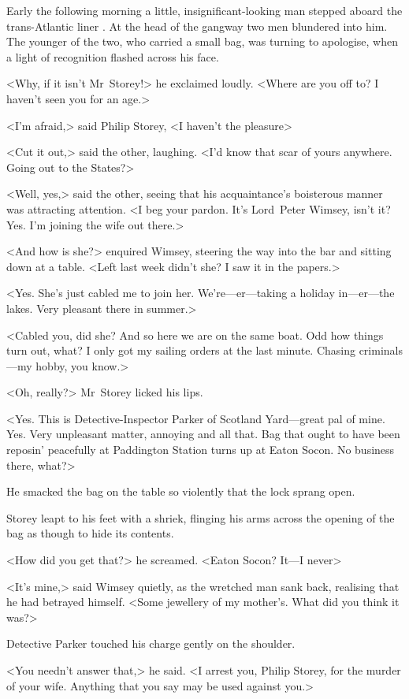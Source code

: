 \divider
Early the following morning a little, insignificant-looking man stepped aboard the trans-Atlantic liner . At the head of the gangway two men blundered into him. The younger of the two, who carried a small bag, was turning to apologise, when a light of recognition flashed across his face.

<Why, if it isn't Mr~Storey!> he exclaimed loudly. <Where are you off to? I haven't seen you for an age.>

<I'm afraid,> said Philip Storey, <I haven't the pleasure\longdash>

<Cut it out,> said the other, laughing. <I'd know that scar of yours anywhere. Going out to the States?>

<Well, yes,> said the other, seeing that his acquaintance's boisterous manner was attracting attention. <I beg your pardon. It's Lord~Peter Wimsey, isn't it? Yes. I'm joining the wife out there.>

<And how is she?> enquired Wimsey, steering the way into the bar and sitting down at a table. <Left last week didn't she? I saw it in the papers.>

<Yes. She's just cabled me to join her. We're—er—taking a holiday in—er—the lakes. Very pleasant there in summer.>

<Cabled you, did she? And so here we are on the same boat. Odd how things turn out, what? I only got my sailing orders at the last minute. Chasing criminals—my hobby, you know.>

<Oh, really?> Mr~Storey licked his lips.

<Yes. This is Detective-Inspector Parker of Scotland Yard—great pal of mine. Yes. Very unpleasant matter, annoying and all that. Bag that ought to have been reposin' peacefully at Paddington Station turns up at Eaton Socon. No business there, what?>

He smacked the bag on the table so violently that the lock sprang open.

Storey leapt to his feet with a shriek, flinging his arms across the opening of the bag as though to hide its contents.

<How did you get that?> he screamed. <Eaton Socon? It—I never\longdash>

<It's mine,> said Wimsey quietly, as the wretched man sank back, realising that he had betrayed himself. <Some jewellery of my mother's. What did you think it was?>

Detective Parker touched his charge gently on the shoulder.

<You needn't answer that,> he said. <I arrest you, Philip Storey, for the murder of your wife. Anything that you say may be used against you.>
